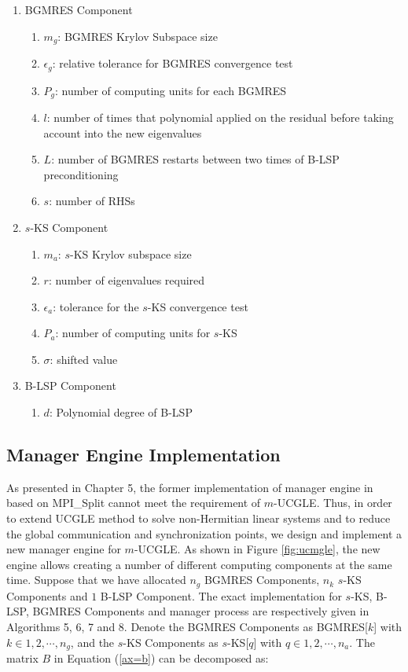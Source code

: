 \begin{enumerate}
	\item BGMRES Component
	\begin{enumerate}
		\item $m_g$: BGMRES Krylov Subspace size
		\item $\epsilon_g$: relative tolerance for BGMRES convergence test
		\item $P_g$: number of computing units for each BGMRES
		\item $l$: number of times that polynomial applied on the residual before taking account into the new eigenvalues
		\item $L$: number of BGMRES restarts between two times of B-LSP preconditioning
		\item $s$: number of RHSs
	\end{enumerate}
	\item $s$-KS Component
	\begin{enumerate}
		\item $m_a$: $s$-KS Krylov subspace size
		\item $r$: number of eigenvalues required
		\item $\epsilon_a$: tolerance for the $s$-KS convergence test
		\item $P_a$: number of computing units for $s$-KS
		\item  $\sigma$: shifted value
	\end{enumerate}
	\item B-LSP Component
	\begin{enumerate}
		\item $d$: Polynomial degree of B-LSP
	\end{enumerate}
\end{enumerate}

\subsection{Manager Engine Implementation}\label{engineimpl}

As presented in Chapter 5, the former implementation of manager engine in \cite{wu2018distributed} based on MPI\_Split cannot meet the requirement of $m$-UCGLE. Thus, in order to extend UCGLE method to solve non-Hermitian linear systems and to reduce the global communication and synchronization points, we design and implement a new manager engine for $m$-UCGLE. As shown in Figure \ref{fig:ucmgle}, the new engine allows creating a number of different computing components at the same time. Suppose that we have allocated $n_g$ BGMRES Components, $n_k$ $s$-KS Components and $1$ B-LSP Component. The exact implementation for $s$-KS, B-LSP, BGMRES Components and manager process are respectively given in Algorithms 5, 6, 7 and 8. Denote the BGMRES Components as BGMRES[$k$] with $k \in 1, 2, \cdots, n_g$, and the $s$-KS Components as $s$-KS[$q$] with $q \in 1, 2, \cdots, n_a$.   The matrix $B$ in Equation (\ref{ax=b}) can be decomposed as:

